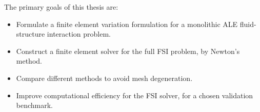 The primary goals of this thesis are:

\begin{itemize}
\item Formulate a finite element variation formulation for a monolithic ALE fluid-structure interaction problem.
\item Construct a finite element solver for the full FSI problem, by Newton's method.
\item Compare different methods to avoid mesh degeneration.
\item Improve computational efficiency for the FSI solver, for a chosen validation benchmark.
\end{itemize}